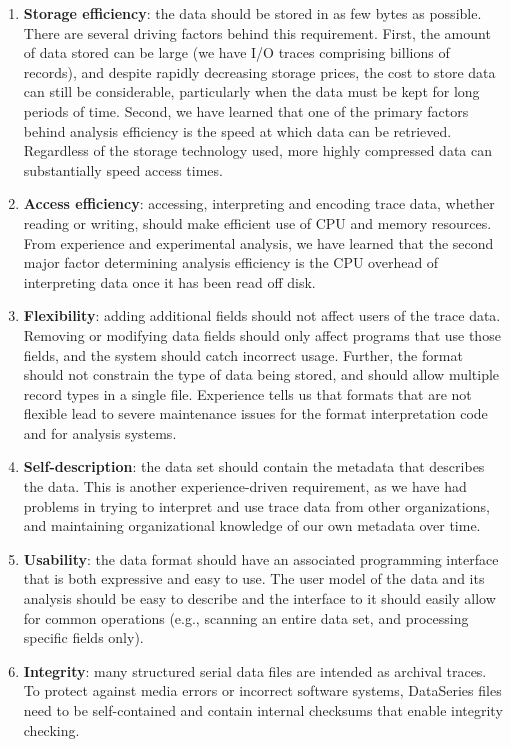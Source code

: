\documentclass{acm_proc_article-sp}
\begin{document}
\begin{enumerate}

\item \textbf{Storage efficiency}: the data should be stored in as few
bytes as possible. There are several driving factors behind this
requirement. 
First, the amount of data stored can be large (we have
I/O traces comprising billions of records), and despite rapidly
decreasing storage prices, the cost to store data can still be
considerable, particularly when the data must be kept for long periods
of time. 
Second, we have learned that one of the primary factors
behind analysis efficiency is the speed at which data can be
retrieved. Regardless of the storage technology used, more highly
compressed data can substantially speed access times.

\item \textbf{Access efficiency}: accessing, interpreting and encoding
trace data, whether reading or writing, should make efficient use of
CPU and memory resources. From experience and experimental analysis,
we have learned that the second major factor determining analysis
efficiency is the CPU overhead of interpreting data once it has been
read off disk.

\item \textbf{Flexibility}: adding additional fields should not affect
users of the trace data.  Removing or modifying data fields should
only affect programs that use those fields, and the system should
catch incorrect usage.  Further, the format should not constrain
the type of data being stored, and should allow multiple record types
in a single file. 
Experience 
tells us that formats that
are not flexible lead to severe maintenance issues for 
the format
interpretation code and for analysis systems.

\item \textbf{Self-description}: the data set should contain the
metadata that describes the data. This is another experience-driven
requirement, as we have had problems in trying to interpret and use
trace data from other organizations, and maintaining organizational
knowledge of our own metadata over time.

\item \textbf{Usability}: the data format should have an
associated programming interface that is both expressive and easy to
use. 
The user model of the data and its analysis should
be easy to describe and the interface to it should easily allow for
common operations (e.g., scanning an entire data set, and processing
specific fields only).

\item \textbf{Integrity}: many structured serial data files are 
intended as archival traces. To protect against media
errors or incorrect software systems, DataSeries files need to be
self-contained and contain internal checksums that enable
integrity checking.

\end{enumerate}
\end{document}
